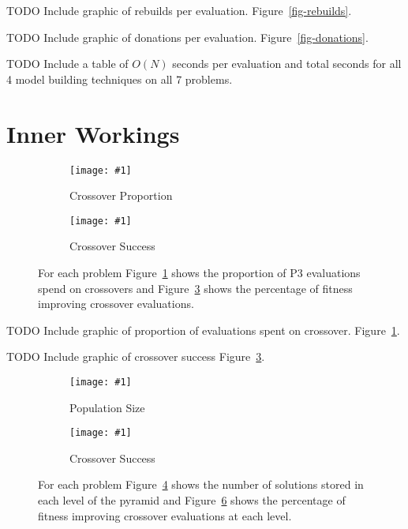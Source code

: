 \documentclass[twoside]{article}
\newcommand{\includegraphicsfit}[1]
{\texttt{[image: \#1]}}
\begin{document}
TODO Include graphic of rebuilds per evaluation. Figure~\ref{fig-rebuilds}.

TODO Include graphic of donations per evaluation. Figure~\ref{fig-donations}.

TODO Include a table of $O(N)$ seconds per evaluation and total seconds for all 4 model building techniques on all 7 problems.

\section{Inner Workings}

\begin{figure}[t]
  \begin{centering}
    \begin{subfigure}{.5\textwidth}
      \begin{centering}
        \includegraphicsfit{cross}
      \end{centering}
      \caption{Crossover Proportion}
      \label{fig-cross}
    \end{subfigure}%
    \begin{subfigure}{.5\textwidth}
      \begin{centering}
        \includegraphicsfit{cross-success}
      \end{centering}
      \caption{Crossover Success}
      \label{fig-cross-success}
    \end{subfigure}
  \end{centering}
  \caption{For each problem Figure~\ref{fig-cross} shows the proportion of P3 evaluations spend on crossovers
           and Figure~\ref{fig-cross-success} shows the percentage of fitness improving crossover evaluations.}
\end{figure}

TODO Include graphic of proportion of evaluations spent on crossover. Figure~\ref{fig-cross}.

TODO Include graphic of crossover success Figure~\ref{fig-cross-success}.

\begin{figure}[t]
  \begin{centering}
    \begin{subfigure}{.5\textwidth}
      \begin{centering}
        \includegraphicsfit{level-size}
      \end{centering}
      \caption{Population Size}
      \label{fig-level-size}
    \end{subfigure}%
    \begin{subfigure}{.5\textwidth}
      \begin{centering}
        \includegraphicsfit{level-success}
      \end{centering}
      \caption{Crossover Success}
      \label{fig-level-success}
    \end{subfigure}
  \end{centering}
  \caption{For each problem Figure~\ref{fig-level-size} shows the number of solutions stored in each level of the pyramid
           and Figure~\ref{fig-level-success} shows the percentage of fitness improving crossover evaluations at each level.}
\end{figure}
\end{document}
